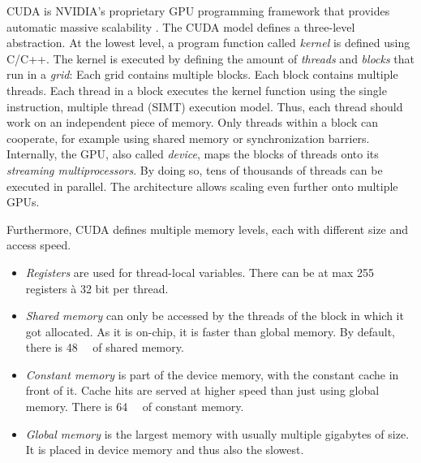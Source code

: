 \documentclass[
fancyheadings, %
%
%
]{stsreprt}
\begin{document}
CUDA is NVIDIA's proprietary GPU programming framework that provides automatic massive scalability \cite{CUDA-Programming-Guide}.
The CUDA model defines a three-level abstraction.
At the lowest level, a program function called \emph{kernel} is defined using C/C++.
The kernel is executed by defining the amount of \emph{threads} and \emph{blocks} that run in a \emph{grid}:
Each grid contains multiple blocks.
Each block contains multiple threads.
Each thread in a block executes the kernel function using the single instruction, multiple thread (SIMT) execution model.
Thus, each thread should work on an independent piece of memory.
Only threads within a block can cooperate, for example using shared memory or synchronization barriers.
Internally, the GPU, also called \emph{device}, maps the blocks of threads onto its \emph{streaming multiprocessors}.
By doing so, tens of thousands of threads can be executed in parallel.
The architecture allows scaling even further onto multiple GPUs.

Furthermore, CUDA defines multiple memory levels, each with different size and access speed.

\begin{itemize}
    \item \emph{Registers} are used for thread-local variables.
          There can be at max 255 registers à 32 bit per thread.


    \item \emph{Shared memory} can only be accessed by the threads of the block in which it got allocated.
          As it is on-chip, it is faster than global memory.
          By default, there is \SI{48}{\kibi\byte} of shared memory.

    \item \emph{Constant memory} is part of the device memory, with the constant cache in front of it.
          Cache hits are served at higher speed than just using global memory.
          There is \SI{64}{\kibi\byte} of constant memory.


    \item \emph{Global memory} is the largest memory with usually multiple gigabytes of size.
          It is placed in device memory and thus also the slowest.
\end{itemize}
\end{document}
